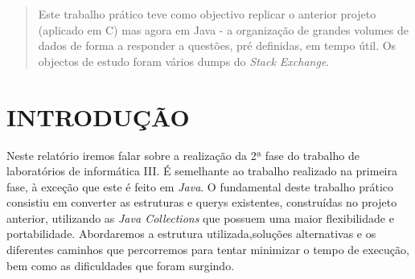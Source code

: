 \author{Adriana Meireles (a82582), Eduardo Jorge Barbosa (a83344), Filipe Monteiro (a80229)%
}





\maketitle
\thispagestyle{empty}
\pagestyle{empty}


\begin{abstract}

Este trabalho prático teve como objectivo replicar o anterior projeto (aplicado em C) mas agora em Java - a organização de grandes volumes de dados de forma a responder a questões, pré definidas, em tempo útil. Os objectos de estudo foram vários dumps do \textit{Stack Exchange}.

\end{abstract}


\section{INTRODUÇÃO}

Neste relatório iremos falar sobre a realização da 2ª fase do trabalho de laboratórios de informática III.
É semelhante ao trabalho realizado na primeira fase, à exceção que este é feito em \textit{Java}.
\newline
O fundamental deste trabalho prático consistiu em converter as estruturas e querys existentes, construídas no projeto anterior, utilizando as \textit{Java Collections} que possuem uma maior flexibilidade e portabilidade.
\newline
Abordaremos a estrutura utilizada,soluções alternativas e os diferentes caminhos que percorremos para tentar minimizar o tempo de execução, bem como as dificuldades que foram surgindo.


